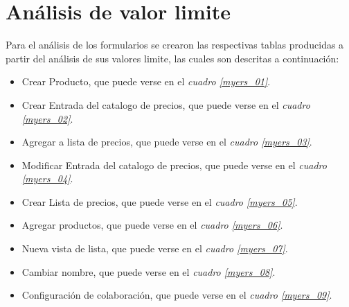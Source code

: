 \section{Análisis de valor limite}
Para el análisis de los formularios se crearon las respectivas tablas producidas
a partir del análisis de sus valores limite, las cuales son descritas a
continuación:

\begin{itemize}
    \item Crear Producto, que puede verse en el \emph{cuadro \ref{myers_01}}.
    \item Crear Entrada del catalogo de precios, que puede verse en el
        \emph{cuadro \ref{myers_02}}.
    \item Agregar a lista de precios, que puede verse en el
        \emph{cuadro \ref{myers_03}}.
    \item Modificar Entrada del catalogo de precios, que puede verse en el
        \emph{cuadro \ref{myers_04}}.
    \item Crear Lista de precios, que puede verse en el
        \emph{cuadro \ref{myers_05}}.
    \item Agregar productos, que puede verse en el \emph{cuadro \ref{myers_06}}.
    \item Nueva vista de lista, que puede verse en el
        \emph{cuadro \ref{myers_07}}.
    \item Cambiar nombre, que puede verse en el \emph{cuadro \ref{myers_08}}.
    \item Configuración de colaboración, que puede verse en el
        \emph{cuadro \ref{myers_09}}.
\end{itemize}

